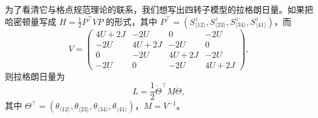 为了看清它与格点规范理论的联系，我们想写出四转子模型的拉格朗日量。如果把哈密顿量写成 $H=\frac{1}{2}P^{\top}VP$ 的形式，其中 $P^{\top}=(S_{\langle12\rangle}^{z},S_{\langle23\rangle}^{z},S_{\langle34\rangle}^{z},S_{\langle41\rangle}^{z})$，而
\begin{equation*}
V=\begin{pmatrix}
4U+2J & -2U & 0 & -2U\\
-2U & 4U+2J & -2U & 0\\
0 & -2U & 4U+2J & -2U\\
-2U & 0 & -2U & 4U+2J
\end{pmatrix},
\end{equation*}
则拉格朗日量为
\begin{equation*}
L=\frac{1}{2}\dot\Theta^{\top}M\dot\Theta,
\end{equation*}
其中 $\Theta^{\top}=(\theta_{\langle12\rangle},\theta_{\langle23\rangle},\theta_{\langle34\rangle},\theta_{\langle41\rangle})$，$M=V^{-1}$。

